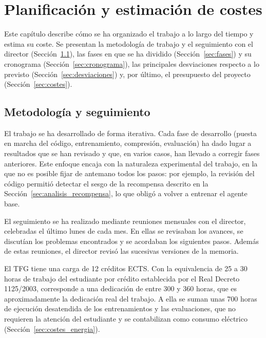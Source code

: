 \chapter{Planificación y estimación de costes}\label{cap:plan}

Este capítulo describe cómo se ha organizado el trabajo a lo largo del tiempo y estima su coste. Se presentan la metodología de trabajo y el seguimiento con el director (Sección~\ref{sec:metodologia}), las fases en que se ha dividido (Sección~\ref{sec:fases}) y su cronograma (Sección~\ref{sec:cronograma}), las principales desviaciones respecto a lo previsto (Sección~\ref{sec:desviaciones}) y, por último, el presupuesto del proyecto (Sección~\ref{sec:costes}).

\section{Metodología y seguimiento}\label{sec:metodologia}

El trabajo se ha desarrollado de forma iterativa. Cada fase de desarrollo (puesta en marcha del código, entrenamiento, compresión, evaluación) ha dado lugar a resultados que se han revisado y que, en varios casos, han llevado a corregir fases anteriores. Este enfoque encaja con la naturaleza experimental del trabajo, en la que no es posible fijar de antemano todos los pasos: por ejemplo, la revisión del código permitió detectar el sesgo de la recompensa descrito en la Sección~\ref{sec:analisis_recompensa}, lo que obligó a volver a entrenar el agente base.

El seguimiento se ha realizado mediante reuniones mensuales con el director, celebradas el último lunes de cada mes. En ellas se revisaban los avances, se discutían los problemas encontrados y se acordaban los siguientes pasos. Además de estas reuniones, el director revisó las sucesivas versiones de la memoria.

El TFG tiene una carga de 12 créditos ECTS. Con la equivalencia de 25 a 30 horas de trabajo del estudiante por crédito establecida por el Real Decreto 1125/2003, corresponde a una dedicación de entre 300 y 360 horas, que es aproximadamente la dedicación real del trabajo. A ella se suman unas 700 horas de ejecución desatendida de los entrenamientos y las evaluaciones, que no requieren la atención del estudiante y se contabilizan como consumo eléctrico (Sección~\ref{sec:costes_energia}).

